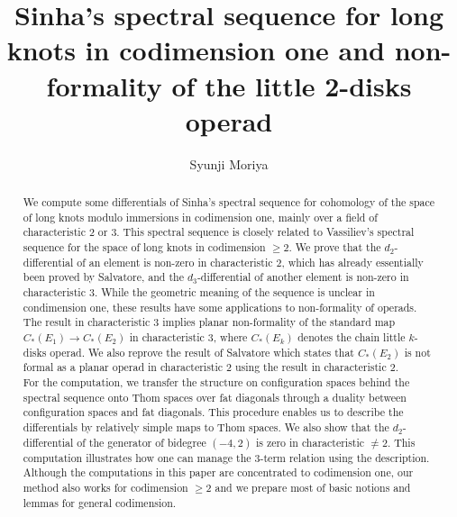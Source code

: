\documentclass[reqno]{amsart}
\title{
Sinha's spectral sequence for long knots in codimension one and  non-formality of the  little 2-disks operad}
\author{Syunji Moriya\\
}
\theoremstyle{definition}
\theoremstyle{plain}
\begin{document}
\begin{abstract}

We compute some differentials of  Sinha's spectral sequence for cohomology of the space of long knots modulo immersions in codimension one, mainly over a field of  characteristic $2$ or $3$. This spectral sequence is closely related to Vassiliev's spectral sequence for the space of  long knots in codimension $\geq 2$. We prove that the $d_2$-differential of an element is non-zero in characteristic $2$, which has already essentially been proved by Salvatore, and the $d_3$-differential of another element is non-zero in characteristic $3$. While the geometric meaning of the sequence is unclear in condimension one, these results have some applications to non-formality of operads. The result in characteristic $3$ implies planar non-formality of the standard map $C_*(E_1)\to C_*(E_2)$ in characteristic $3$, where $C_*(E_k)$ denotes the chain little $k$-disks operad. We also reprove the result of Salvatore which states that $C_*(E_2)$ is not formal as a planar operad in characteristic $2$ using the result in characteristic $2$. \\
For the computation, we transfer the structure on configuration spaces  behind the spectral sequence onto Thom spaces over fat diagonals through a duality between configuration spaces and fat diagonals.  This procedure enables us to describe the differentials by relatively simple maps to Thom spaces. We also show that the $d_2$-differential of the generator of bidegree $(-4,2)$ is zero in characteristic $\not= 2$. This computation  illustrates how one can manage the 3-term relation using the description. Although the computations in this paper are concentrated to codimension one, our method also works for codimension $\geq 2$ and we prepare most of basic notions and lemmas for general codimension.
\end{abstract}
\maketitle
\tableofcontents
\end{document}
